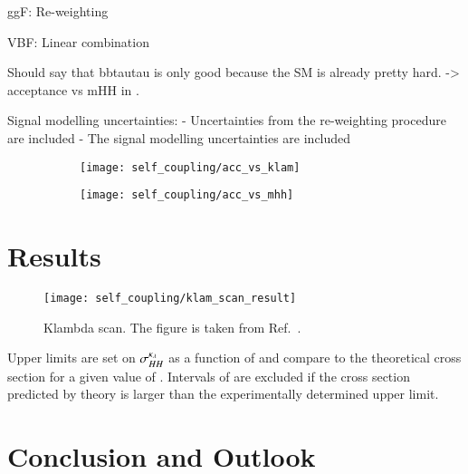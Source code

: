
ggF: Re-weighting

VBF: Linear combination



Should say that bbtautau is only good because the SM is already pretty
hard. -> acceptance vs mHH in \hadhad.


Signal modelling uncertainties:
- Uncertainties from the re-weighting procedure are included
- The signal modelling uncertainties are included

\begin{figure}[htbp]
  \centering

  \begin{subfigure}[t]{0.485\textwidth}
    \texttt{[image: self\_coupling/acc\_vs\_klam]}
    \subcaption{}
  \end{subfigure}\hfill%
  \begin{subfigure}[t]{0.485\textwidth}
    \texttt{[image: self\_coupling/acc\_vs\_mhh]}
    \subcaption{}
  \end{subfigure}

  \caption{}%
  \label{fig:acceptance_vs_klambda}
\end{figure}


\section{Results}%
\label{sec:reinterpretation_results}


\begin{figure}[htbp]
  \centering

  \texttt{[image: self\_coupling/klam\_scan\_result]}

  \caption{Klambda scan. The figure is taken from
    Ref.~\cite{ATLAS-CONF-2021-052}.}%
  \label{fig:klambda_scan}
\end{figure}

Upper limits are set on $\sigma_{HH}^{\kappa_{\lambda}}$ as a function of
\klambda and compare to the theoretical cross section for a given
value of \klambda. Intervals of \klambda are excluded if the cross
section predicted by theory is larger than the experimentally
determined upper limit.


\section{Conclusion and Outlook}%
\label{sec:reinterpretation_conclusion}



